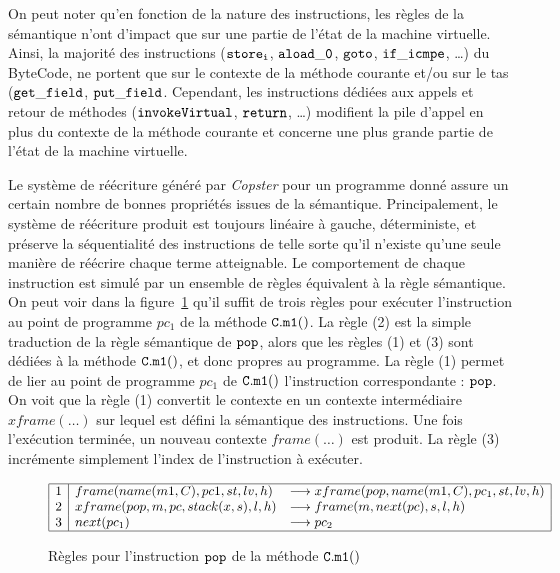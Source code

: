 On peut noter qu'en fonction de la nature des instructions, les règles
de la sémantique n'ont d'impact que sur une partie de l'état de la
machine virtuelle. Ainsi, la majorité des instructions ($\mathtt{store_i}$,
$\mathtt{aload\_0}$, $\mathtt{goto}$, $\mathtt{if\_icmpe}$, \dots) du ByteCode,
ne portent que sur le contexte de la méthode courante et/ou sur le tas
($\mathtt{get\_field}$, $\mathtt{put\_field}$. Cependant, les instructions
dédiées aux appels et retour de méthodes ($\mathtt{invokeVirtual}$, $\mathtt{return}$, \dots)
modifient la pile d'appel en plus du contexte de la méthode courante et
concerne une plus grande partie de l'état de la machine virtuelle.

Le système de réécriture généré par \emph{Copster} pour un programme
donné assure un certain nombre de bonnes propriétés issues de la
sémantique. Principalement, le système de réécriture produit est toujours
linéaire à gauche, déterministe, et préserve la séquentialité
des instructions de telle sorte qu'il n'existe qu'une seule manière de
réécrire chaque terme atteignable.  Le comportement de chaque
instruction est simulé par un ensemble de règles équivalent à la règle
sémantique. On peut voir dans la figure~\ref{fig:semantique-trs} qu'il suffit
de trois règles pour exécuter l'instruction au point de programme $pc_1$ de la méthode
$\mathtt{C.m1()}$. La règle (2) est la simple traduction de la règle sémantique de $\mathtt{pop}$,
alors que les règles (1) et (3) sont dédiées à la méthode $\mathtt{C.m1}()$, et donc propres au 
programme. La règle (1) permet de lier au point de programme $pc_1$ de $\mathtt{C.m1}()$ l'instruction
correspondante : $\mathtt{pop}$. On voit que la règle (1) convertit le contexte en un contexte intermédiaire $xframe(\dots)$
sur lequel est défini la sémantique des instructions. Une fois l'exécution terminée, un nouveau 
contexte $frame(\dots)$ est produit. La règle (3) incrémente simplement l'index de l'instruction à exécuter.

\begin{figure}[ht!]
  \centering
  \[
  {%
    \begin{array}{|c|ll|}
      \hline
      1 & frame(name(m1, C), pc1, st, lv, h) & \lrw xframe(pop, name(m1, C), pc_1, st, lv, h)\\
      2 & xframe(pop, m, pc, stack(x, s), l, h) & \lrw frame(m, next(pc), s, l, h) \\
      3 & next(pc_1) &\lrw pc_2 \\
      \hline
    \end{array}
  }
  \]
  \caption{\footnotesize Règles pour l'instruction $\mathtt{pop}$ de la méthode $\mathtt{C.m1()}$}
  \label{fig:semantique-trs}
\end{figure}


